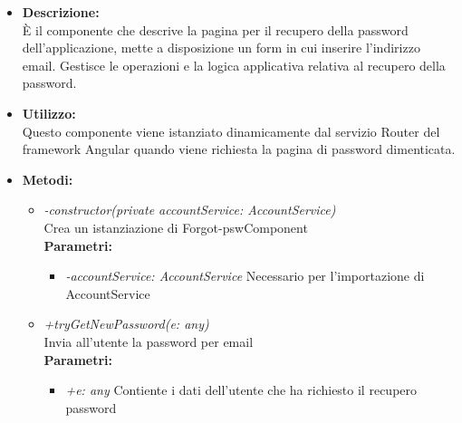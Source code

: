 \begin{itemize}
	\item \textbf{Descrizione:}\\
	È il componente che descrive la pagina per il recupero della password dell'applicazione, mette a disposizione un form in cui inserire l'indirizzo email. Gestisce le operazioni e la logica applicativa relativa al recupero della password.
	\item \textbf{Utilizzo:}\\
	Questo componente viene istanziato dinamicamente dal servizio Router del framework Angular quando viene richiesta la pagina di password dimenticata.
	\item \textbf{Metodi:}
		\begin{itemize}
			\item \emph{-constructor(private accountService: AccountService)}\\
    	Crea un istanziazione di Forgot-pswComponent\\
    	\textbf{Parametri:}
    		\begin{itemize}
    			\item \emph{-accountService: AccountService}
    			Necessario per l'importazione di AccountService
    		\end{itemize}
    		\item \emph{+tryGetNewPassword(e: any)}\\
    		Invia all'utente la password per email\\
    		\textbf{Parametri:}
    		\begin{itemize}
    			\item \emph{+e: any}
    			Contiente i dati dell'utente che ha richiesto il recupero password
    		\end{itemize}
		\end{itemize}
\end{itemize}